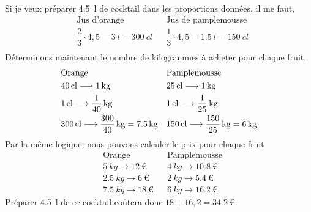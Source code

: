 %
%
    Si je veux préparer \SI{4,5}{l} de cocktail dans les proportions données,
    il me faut,
    \begin{align*}
         & \text{Jus d'orange}                               &  & \text{Jus de pamplemousse}                         \\
         & \dfrac{2}{3}\cdot 4,5  = \SI{3}{l} = \SI{300}{cl} &  & \dfrac{1}{3}\cdot 4,5 = \SI{1,5}{l} = \SI{150}{cl} \\
    \end{align*}
    Déterminons maintenant le nombre de kilogrammes à acheter pour chaque fruit,
    \begin{align*}
         & \text{Orange}                                                                        &  & \text{Pamplemousse}                                                                \\
         & \SI{40}{cl}\longrightarrow\SI{1}{kg}                                                 &  & \SI{25}{cl}\longrightarrow\SI{1}{kg}                                               \\
         & \SI{1}{cl}\longrightarrow\SI[parse-numbers=false]{\frac{1}{40}}{kg}                  &  & \SI{1}{cl}\longrightarrow\SI[parse-numbers=false]{\frac{1}{25}}{kg}                \\
         & \SI{300}{cl}\longrightarrow\SI[parse-numbers=false]{\frac{300}{40}}{kg}=\SI{7,5}{kg} &  & \SI{150}{cl}\longrightarrow\SI[parse-numbers=false]{\frac{150}{25}}{kg}=\SI{6}{kg} \\
    \end{align*}
    Par la même logique, nous pouvons calculer le prix pour chaque fruit
    \begin{align*}
         & \text{Orange}                         &  & \text{Pamplemousse}                   \\
         & \SI{5}{kg}\longrightarrow\SI{12}{€}   &  & \SI{4}{kg}\longrightarrow\SI{10,8}{€} \\
         & \SI{2,5}{kg}\longrightarrow\SI{6}{€}  &  & \SI{2}{kg}\longrightarrow\SI{5,4}{€}  \\
         & \SI{7,5}{kg}\longrightarrow\SI{18}{€} &  & \SI{6}{kg}\longrightarrow\SI{16,2}{€}
    \end{align*}
    Préparer \SI{4,5}{l} de ce cocktail coûtera donc $18+16,2=\SI{34,2}{€}$.
